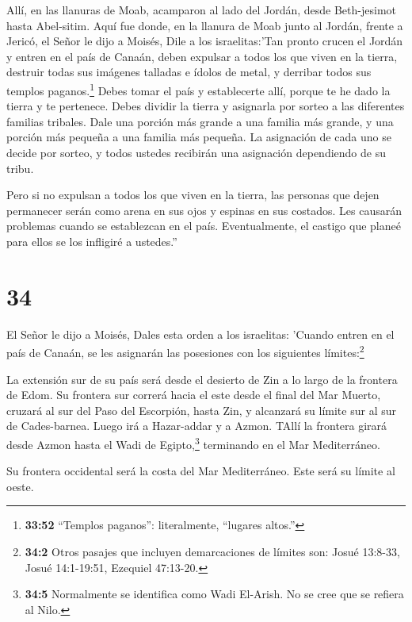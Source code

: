  Allí, en las llanuras de Moab, acamparon al lado del
Jordán, desde Beth-jesimot hasta Abel-sitim.  Aquí fue
donde, en la llanura de Moab junto al Jordán, frente a Jericó, el Señor
le dijo a Moisés,  Dile a los israelitas:'Tan pronto crucen
el Jordán y entren en el país de Canaán,  deben expulsar a
todos los que viven en la tierra, destruir todas sus imágenes talladas e
ídolos de metal, y derribar todos sus templos paganos.\footnote{\textbf{33:52}
  ``Templos paganos'': literalmente, ``lugares altos.''} 
Debes tomar el país y establecerte allí, porque te he dado la tierra y
te pertenece.  Debes dividir la tierra y asignarla por
sorteo a las diferentes familias tribales. Dale una porción más grande a
una familia más grande, y una porción más pequeña a una familia más
pequeña. La asignación de cada uno se decide por sorteo, y todos ustedes
recibirán una asignación dependiendo de su tribu.

 Pero si no expulsan a todos los que viven en la tierra,
las personas que dejen permanecer serán como arena en sus ojos y espinas
en sus costados. Les causarán problemas cuando se establezcan en el
país.  Eventualmente, el castigo que planeé para ellos se
los infligiré a ustedes.''

\hypertarget{section-33}{%
\section{34}\label{section-33}}

 El Señor le dijo a Moisés,  Dales esta orden a
los israelitas: 'Cuando entren en el país de Canaán, se les asignarán
las posesiones con los siguientes límites:\footnote{\textbf{34:2} Otros
  pasajes que incluyen demarcaciones de límites son: Josué 13:8-33,
  Josué 14:1-19:51, Ezequiel 47:13-20.}

 La extensión sur de su país será desde el desierto de Zin a
lo largo de la frontera de Edom. Su frontera sur correrá hacia el este
desde el final del Mar Muerto,  cruzará al sur del Paso del
Escorpión, hasta Zin, y alcanzará su límite sur al sur de Cades-barnea.
Luego irá a Hazar-addar y a Azmon.  TAllí la frontera girará
desde Azmon hasta el Wadi de Egipto,\footnote{\textbf{34:5} Normalmente
  se identifica como Wadi El-Arish. No se cree que se refiera al Nilo.}
terminando en el Mar Mediterráneo.

 Su frontera occidental será la costa del Mar Mediterráneo.
Este será su límite al oeste.

